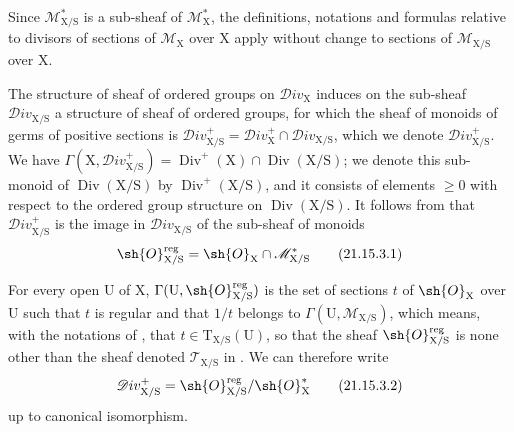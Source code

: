 Since $\mathscr{M}_{\mathrm{X}/\mathrm{S}}^*$ is a sub-sheaf of $\mathscr{M}_{\mathrm{X}}^*$, the definitions, notations and formulas relative to divisors of sections of $\mathscr{M}_{\mathrm{X}}$ over $\mathrm{X}$  apply without change to sections of $\mathscr{M}_{\mathrm{X}/\mathrm{S}}$ over $\mathrm{X}$.

\begin{env}[21.15.3]
\label{IV.21.15.3}
The structure of sheaf of ordered groups on $\mathscr{D}iv_{\mathrm{X}}$  induces on the sub-sheaf $\mathscr{D}iv_{\mathrm{X}/\mathrm{S}}$ a structure of sheaf of ordered groups, for which the sheaf of monoids of germs of positive sections is $\mathscr{D}iv_{\mathrm{X}/\mathrm{S}}^+=\mathscr{D}iv_{\mathrm{X}}^+\cap\mathscr{D}iv_{\mathrm{X}/\mathrm{S}}$, which we denote $\mathscr{D}iv_{\mathrm{X}/\mathrm{S}}^+$.
We have $\Gamma(\mathrm{X},\mathscr{D}iv_{\mathrm{X}/\mathrm{S}}^+)=\operatorname{Div}^+(\mathrm{X})\cap\operatorname{Div}(\mathrm{X}/\mathrm{S})$; we denote this sub-monoid of $\operatorname{Div}(\mathrm{X}/\mathrm{S})$ by $\operatorname{Div}^+(\mathrm{X}/\mathrm{S})$, and it consists of elements $\geq 0$ with respect to the ordered group structure on $\operatorname{Div}(\mathrm{X}/\mathrm{S})$.
It follows from  that $\mathscr{D}iv_{\mathrm{X}/\mathrm{S}}^+$ is the image in $\mathscr{D}iv_{\mathrm{X}/\mathrm{S}}$ of the sub-sheaf of monoids
\[
\label{IV.21.15.3.1}
  \sh{O}_{\mathrm{X}/\mathrm{S}}^{\operatorname{reg}}=\sh{O}_{\mathrm{X}}\cap\mathscr{M}_{\mathrm{X}/\mathrm{S}}^*
  \tag{21.15.3.1}
\]
\end{env}

For every open $\mathrm{U}$ of $\mathrm{X}$, $\Gamma(\mathrm{U},\sh{O}_{\mathrm{X}/\mathrm{S}}^{\operatorname{reg}})$ is the set of sections $t$ of $\sh{O}_{\mathrm{X}}$ over $\mathrm{U}$ such that $t$ is regular and that $1/t$ belongs to $\Gamma(\mathrm{U},\mathscr{M}_{\mathrm{X}/\mathrm{S}})$, which means, with the notations of , that $t\in\mathrm{T}_{\mathrm{X}/\mathrm{S}}(\mathrm{U})$, so that the sheaf $\sh{O}_{\mathrm{X}/\mathrm{S}}^{\operatorname{reg}}$ is none other than the sheaf denoted $\mathscr{T}_{\mathrm{X}/\mathrm{S}}$ in .
We can therefore write
\[
\label{IV.21.15.3.2}
  \mathscr{D}iv_{\mathrm{X}/\mathrm{S}}^+=\sh{O}_{\mathrm{X}/\mathrm{S}}^{\operatorname{reg}}/\sh{O}_{\mathrm{X}}^*
  \tag{21.15.3.2}
\]
up to canonical isomorphism.

